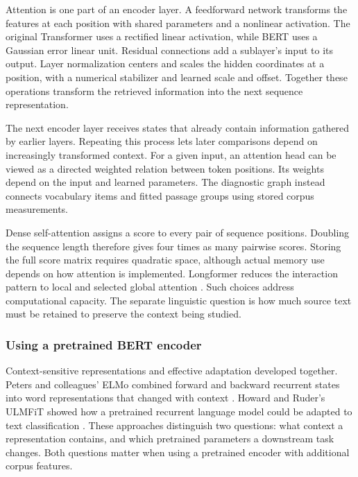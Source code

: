 \documentclass[10pt,letterpaper]{article}
\begin{document}
Attention is one part of an encoder layer. A feedforward network transforms the features at each position with shared parameters and a nonlinear activation. The original Transformer uses a rectified linear activation, while BERT uses a Gaussian error linear unit. Residual connections add a sublayer's input to its output. Layer normalization centers and scales the hidden coordinates at a position, with a numerical stabilizer and learned scale and offset. Together these operations transform the retrieved information into the next sequence representation.\par

The next encoder layer receives states that already contain information gathered by earlier layers. Repeating this process lets later comparisons depend on increasingly transformed context. For a given input, an attention head can be viewed as a directed weighted relation between token positions. Its weights depend on the input and learned parameters. The diagnostic graph instead connects vocabulary items and fitted passage groups using stored corpus measurements.\par

Dense self-attention assigns a score to every pair of sequence positions. Doubling the sequence length therefore gives four times as many pairwise scores. Storing the full score matrix requires quadratic space, although actual memory use depends on how attention is implemented. Longformer reduces the interaction pattern to local and selected global attention \cite{longformer}. Such choices address computational capacity. The separate linguistic question is how much source text must be retained to preserve the context being studied.\par

\subsubsection{Using a pretrained BERT encoder}
Context-sensitive representations and effective adaptation developed together. Peters and colleagues' ELMo combined forward and backward recurrent states into word representations that changed with context \cite{elmo}. Howard and Ruder's ULMFiT showed how a pretrained recurrent language model could be adapted to text classification \cite{ulmfit}. These approaches distinguish two questions: what context a representation contains, and which pretrained parameters a downstream task changes. Both questions matter when using a pretrained encoder with additional corpus features.\par
\end{document}
